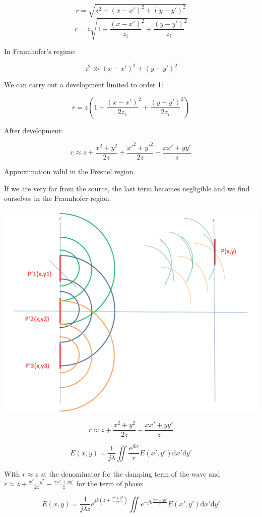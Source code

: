 \documentclass[10pt,a4paper]{article}
\begin{document}
\[r=\sqrt{z^2+(x-x')^2+(y-y')^2}\]
\[r=z\sqrt{1+\frac{(x-x')}{z_i}^2+\frac{(y-y')}{z_i}^2}\]

In Fraunhofer’s regime:

\[z^2\gg(x-x')^2+(y-y')^2\]

We can carry out a development limited to order 1: 

\[r=z\left(1+\frac{(x-x')}{2z_i}^2+\frac{(y-y')}{2z_i}^2\right)\]

After development:

\[r \approx z+\frac{x^2+y^2}{2z}+\frac{x'^2+y'^2}{2z}-\frac{xx'+yy'}{z}\]

Approximation valid in the Fresnel region. 

If we are very far from the source, the last term becomes negligible and we find ourselves in the Fraunhofer region.

\begin{center}
\includegraphics[scale=0.32]{../Ressources/schema-3-crop.png}
\end{center}

\[r \approx z+\frac{x^2+y^2}{2z}-\frac{xx'+yy'}{z}\]

\[E(x,y)=\frac{1}{j\lambda} \iint \frac{e^{jkr}}{r}E(x',y')\mathrm{d}x'\mathrm{d}y'\]

With $r\approx z$ at the denominator for the damping term of the wave and $r \approx z+\frac{x^2+y^2}{2z}-\frac{xx'+yy'}{z}$ for the term of phase:

\[E(x,y)=\frac{1}{j\lambda z} e^{jk\left(z+\frac{x^2+y^2}{2z}\right)}\iint e^{-jk\frac{xx'+yy'}{z}}E(x',y')\mathrm{d}x'\mathrm{d}y'\]
\end{document}
